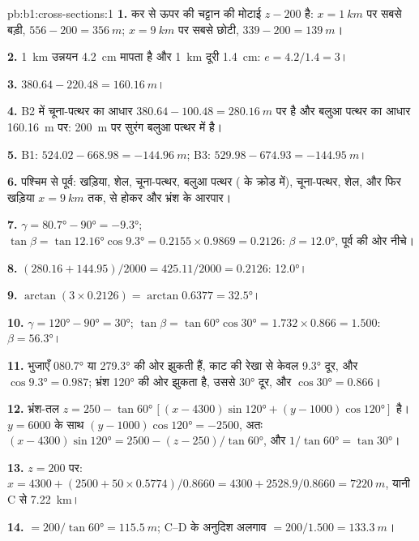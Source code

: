 \begin{solution}{pb:b1:cross-sections:1}
\textbf{1.} कर से ऊपर की चट्टान की मोटाई $z - 200$ है: $x = \qty{1}{km}$ पर सबसे बड़ी, $556 - 200 = \qty{356}{m}$;
$x =
\qty{9}{km}$ पर सबसे छोटी, $339 - 200 = \qty{139}{m}$।

\textbf{2.} \qty{1}{km} उन्नयन \qty{4.2}{cm} मापता है और \qty{1}{km} दूरी \qty{1.4}{cm}: $e = 4.2/1.4 = 3$।

\textbf{3.} $380.64 - 220.48 = \qty{160.16}{m}$।

\textbf{4.} B2 में चूना-पत्थर का आधार $380.64 - 100.48 =
\qty{280.16}{m}$ पर है और बलुआ पत्थर का आधार \qty{160.16}{m} पर: \qty{200}{m} पर सुरंग बलुआ पत्थर में है।

\textbf{5.} B1: $524.02 - 668.98 = \qty{-144.96}{m}$; B3: $529.98 - 674.93 =
\qty{-144.95}{m}$।

\textbf{6.} पश्चिम से पूर्व: खड़िया, शेल, चूना-पत्थर, बलुआ पत्थर ( के क्रोड में), चूना-पत्थर, शेल, और फिर खड़िया
$x = \qty{9}{km}$ तक,  से होकर और भ्रंश के आरपार।

\textbf{7.} $\gamma = \ang{80.7} - \ang{90} = \ang{-9.3}$; $\tan\beta =
\tan\ang{12.16}\cos\ang{9.3} = 0.2155\times0.9869 = 0.2126$: $\beta =
\ang{12.0}$, पूर्व की ओर नीचे।

\textbf{8.} $(280.16 + 144.95)/2000 = 425.11/2000 = 0.2126$: \ang{12.0}।

\textbf{9.} $\arctan(3\times0.2126) = \arctan 0.6377 = \ang{32.5}$।

\textbf{10.} $\gamma = \ang{120} - \ang{90} = \ang{30}$; $\tan\beta =
\tan\ang{60}\cos\ang{30} = 1.732\times0.866 = 1.500$: $\beta = \ang{56.3}$।

\textbf{11.} भुजाएँ \ang{080.7} या \ang{279.3} की ओर झुकती हैं, काट की रेखा से केवल \ang{9.3} दूर, और $\cos\ang{9.3} = 0.987$;
भ्रंश \ang{120} की ओर झुकता है, उससे \ang{30} दूर, और $\cos\ang{30} = 0.866$।

\textbf{12.} भ्रंश-तल $z = 250 - \tan\ang{60}\,[(x - 4300)
\sin\ang{120} + (y - 1000)\cos\ang{120}]$ है। $y = 6000$ के साथ $(y - 1000)
\cos\ang{120} = -2500$, अतः $(x - 4300)\sin\ang{120} = 2500 - (z - 250)/
\tan\ang{60}$, और $1/\tan\ang{60} = \tan\ang{30}$।

\textbf{13.} $z = 200$ पर: $x = 4300 + (2500 + 50\times0.5774)/0.8660 =
4300 + 2528.9/0.8660 = \qty{7220}{m}$, यानी C से \qty{7.22}{km}।

\textbf{14.}  $= 200/\tan\ang{60} = \qty{115.5}{m}$; C--D के अनुदिश अलगाव $= 200/1.500 = \qty{133.3}{m}$।


\end{solution}
